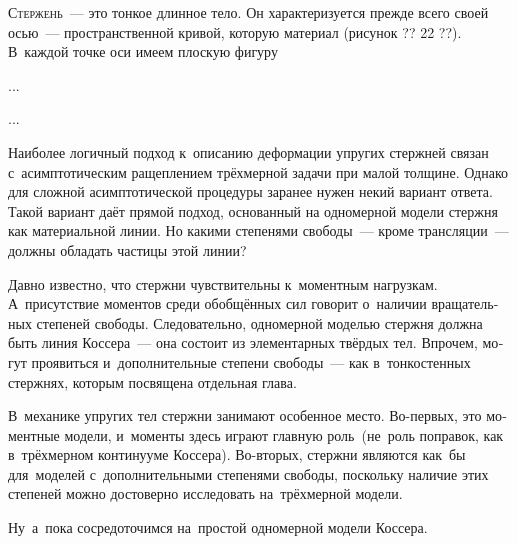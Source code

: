 

\thispagestyle{empty}

\newcommand{\surface}{\Upomega} %
\newcommand{\surfaceexpminusone}{\surface^{\hspace{-0.2ex}\expminusone}}

\label{chapter:rods}



\label{para:overviewofrods}

\begin{otherlanguage}{russian}

\lettrine[lines=2, findent=2pt, nindent=0pt]{С}{тержень}~--- это тонкое длинное тело. Он характеризуется прежде всего своей осью~--- пространственной кривой, которую  материал (рисунок ?? 22 ??). В~каждой точке оси имеем плоскую фигуру

...


...


Наиболее логичный подход к~описанию деформации упругих стержней связан с~асимптотическим ращеплением трёхмерной задачи при малой толщине. Однако для сложной асимптотической процедуры заранее нужен некий вариант ответа. Такой вариант даёт прямой подход, основанный на одномерной модели стержня как материальной линии. Но какими степенями свободы~--- кроме трансляции~--- должны обладать частицы этой линии?

Давно известно, что стержни чувствительны к~моментным нагрузкам. А~присутствие моментов среди обобщённых сил говорит о~наличии вращательных степеней свободы. Следовательно, одномерной моделью стержня должна быть линия Коссера~--- она состоит из элементарных твёрдых тел. Впрочем, могут проявиться и~дополнительные степени свободы~--- как в~тонкостенных стержнях, которым посвящена отдельная глава.

В~механике упругих тел стержни занимают особенное место. Во\hbox{-}первых, это моментные модели, и~моменты здесь играют главную роль~(не~роль поправок, как в~трёхмерном континууме Коссера). Во\hbox{-}вторых, стержни являются как~бы  для~моделей с~дополнительными степенями свободы, поскольку наличие этих степеней можно достоверно исследовать на~трёх\-мерной модели.

Ну~а~пока сосредоточимся на~простой одномерной модели Коссера.



\end{otherlanguage}

